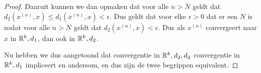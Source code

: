 \begin{proof}
    Daaruit kunnen we dan opmaken dat voor alle \(n>N\) geldt dat \(d_{2}(x^{(n)},x)\leq d_{1}(x^{(n)},x)<\epsilon\). Dus geldt dat voor elke \(\epsilon>0\) dat er een \(N\) is zodat voor alle \(n>N\) geldt dat \(d_{2}(x^{(n)},x)<\epsilon\). Dus als \(x^{(n)}\) convergeert naar \(x\) in \(\mathbb{R}^{k},d_{1}\), dan ook in \(\mathbb{R}^{k},d_{2}\).

    Nu hebben we dus aangetoond dat convergentie in \(\mathbb{R}^{k},d_{2},d_{2}\) convergentie in \(\mathbb{R}^{k},d_{1}\) impliceert en andersom, en dus zijn de twee begrippen equivalent. 
\end{proof}
